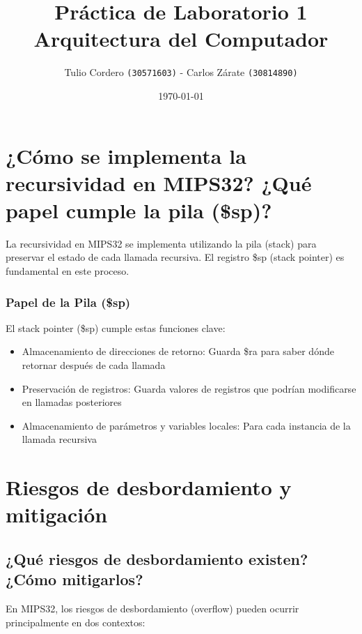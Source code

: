 \documentclass{article}
\begin{document}
\title{
    \textbf{Práctica de Laboratorio 1} \\
    \large Arquitectura del Computador
}
\author{
    Tulio Cordero \texttt{(30571603)} -
    Carlos Zárate \texttt{(30814890)}
}
\date{\today}

\maketitle

\section{¿Cómo se implementa la recursividad en MIPS32? ¿Qué papel cumple la pila (\$sp)?}

La recursividad en MIPS32 se implementa utilizando la pila (stack) para preservar el estado de cada llamada recursiva. El registro \$sp (stack pointer) es fundamental en este proceso.

\subsubsection*{Papel de la Pila (\$sp)}

El stack pointer (\$sp) cumple estas funciones clave:

\begin{itemize}[leftmargin=*]
    \item Almacenamiento de direcciones de retorno: Guarda \$ra para saber dónde retornar después de cada llamada
    \item Preservación de registros: Guarda valores de registros que podrían modificarse en llamadas posteriores
    \item Almacenamiento de parámetros y variables locales: Para cada instancia de la llamada recursiva
\end{itemize}

\section{Riesgos de desbordamiento y mitigación}

\subsection{¿Qué riesgos de desbordamiento existen? ¿Cómo mitigarlos?}

En MIPS32, los riesgos de desbordamiento (overflow) pueden ocurrir principalmente en dos contextos:
\end{document}

